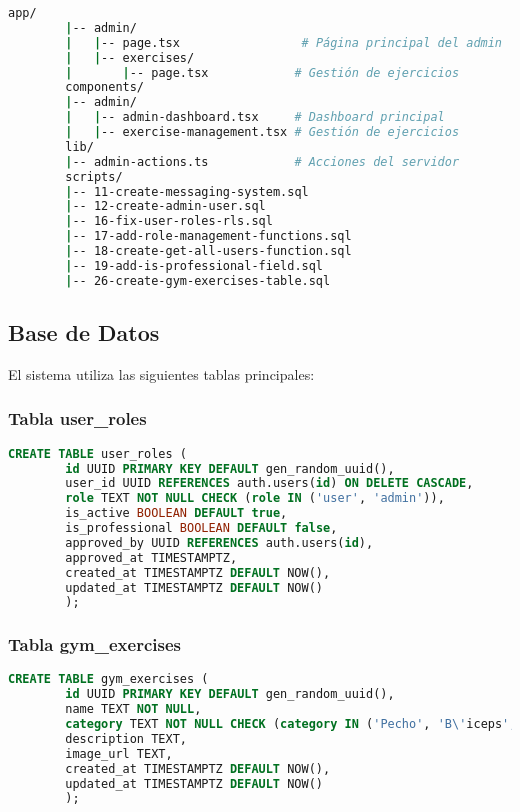 \documentclass[12pt,a4paper]{article}
\begin{document}
	\begin{lstlisting}[language=bash, caption=Estructura del módulo de administrador]
		app/
		|-- admin/
		|   |-- page.tsx                 # Página principal del admin
		|   |-- exercises/
		|       |-- page.tsx            # Gestión de ejercicios
		components/
		|-- admin/
		|   |-- admin-dashboard.tsx     # Dashboard principal
		|   |-- exercise-management.tsx # Gestión de ejercicios
		lib/
		|-- admin-actions.ts            # Acciones del servidor
		scripts/
		|-- 11-create-messaging-system.sql
		|-- 12-create-admin-user.sql
		|-- 16-fix-user-roles-rls.sql
		|-- 17-add-role-management-functions.sql
		|-- 18-create-get-all-users-function.sql
		|-- 19-add-is-professional-field.sql
		|-- 26-create-gym-exercises-table.sql
	\end{lstlisting}
	
	\subsection{Base de Datos}
	
	El sistema utiliza las siguientes tablas principales:
	
	\subsubsection{Tabla user\_roles}
	\begin{lstlisting}[language=SQL, caption=Estructura de la tabla user\_roles]
		CREATE TABLE user_roles (
		id UUID PRIMARY KEY DEFAULT gen_random_uuid(),
		user_id UUID REFERENCES auth.users(id) ON DELETE CASCADE,
		role TEXT NOT NULL CHECK (role IN ('user', 'admin')),
		is_active BOOLEAN DEFAULT true,
		is_professional BOOLEAN DEFAULT false,
		approved_by UUID REFERENCES auth.users(id),
		approved_at TIMESTAMPTZ,
		created_at TIMESTAMPTZ DEFAULT NOW(),
		updated_at TIMESTAMPTZ DEFAULT NOW()
		);
	\end{lstlisting}
	
	\subsubsection{Tabla gym\_exercises}
	\begin{lstlisting}[language=SQL, caption=Estructura de la tabla gym\_exercises]
		CREATE TABLE gym_exercises (
		id UUID PRIMARY KEY DEFAULT gen_random_uuid(),
		name TEXT NOT NULL,
		category TEXT NOT NULL CHECK (category IN ('Pecho', 'B\'iceps', 'Tr\'iceps', 'Hombros', 'Pierna', 'Espalda', 'Otros')),
		description TEXT,
		image_url TEXT,
		created_at TIMESTAMPTZ DEFAULT NOW(),
		updated_at TIMESTAMPTZ DEFAULT NOW()
		);
	\end{lstlisting}
	
\end{document}
